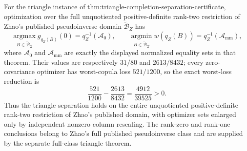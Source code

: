 For the triangle instance of thm:triangle-completion-separation-certificate, optimization over the full unquotiented positive-definite rank-two restriction of Zhao's published pseudoinverse domain \(\widetilde{\mathcal B}_Z\) has
\[
\operatorname*{argmax}_{B\in\widetilde{\mathcal B}_Z}g_{q_Z(B)}(0)=q_Z^{-1}(\mathcal A_0),
\qquad
\operatorname*{argmin}_{B\in\widetilde{\mathcal B}_Z}w(q_Z(B))=q_Z^{-1}(\mathcal A_{\mathrm{mm}}),
\]
where \(\mathcal A_0\) and \(\mathcal A_{\mathrm{mm}}\) are exactly the displayed normalized equality sets in that theorem.  Their values are respectively \(31/80\) and \(2613/8432\); every zero-covariance optimizer has worst-copula loss \(521/1200\), so the exact worst-loss reduction is
\[
\frac{521}{1200}-\frac{2613}{8432}=\frac{4912}{39525}>0.
\]
Thus the triangle separation holds on the entire unquotiented positive-definite rank-two restriction of Zhao's published domain, with optimizer sets enlarged only by independent nonzero column rescaling.  The rank-zero and rank-one conclusions belong to Zhao's full published pseudoinverse class and are supplied by the separate full-class triangle theorem.